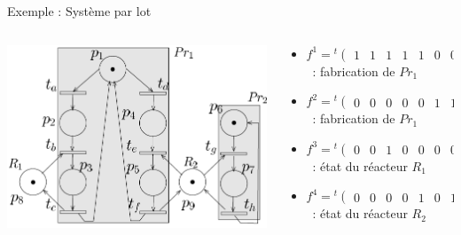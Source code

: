 \documentclass[compress]{beamer}
\begin{document}
\begin{frame}{Exemple : Système par lot}
\begin{columns}
	\begin{column}{.4\linewidth}
	\begin{center}
		\includegraphics[width=\linewidth]{rea1}
	\end{center}
	\end{column}		
	\begin{column}{.66\linewidth}
		\begin{itemize}
		\item $f^1 = {}^t\begin{pmatrix}1&1&1&1&1&0&0&0&0\end{pmatrix}$~:
			fabrication de $Pr_1$
		\item $f^2 = {}^t\begin{pmatrix}0&0&0&0&0&1&1&0&0\end{pmatrix}$~:
			fabrication de $Pr_1$
		\item $f^3 = {}^t\begin{pmatrix}0&0&1&0&0&0&0&1&0\end{pmatrix}$~:
			état du réacteur $R_1$
		\item $f^4 = {}^t\begin{pmatrix}0&0&0&0&1&0&1&0&1\end{pmatrix}$~:
			état du réacteur $R_2$
		\end{itemize}
	\end{column}
\end{columns}
\end{frame}
\end{document}
